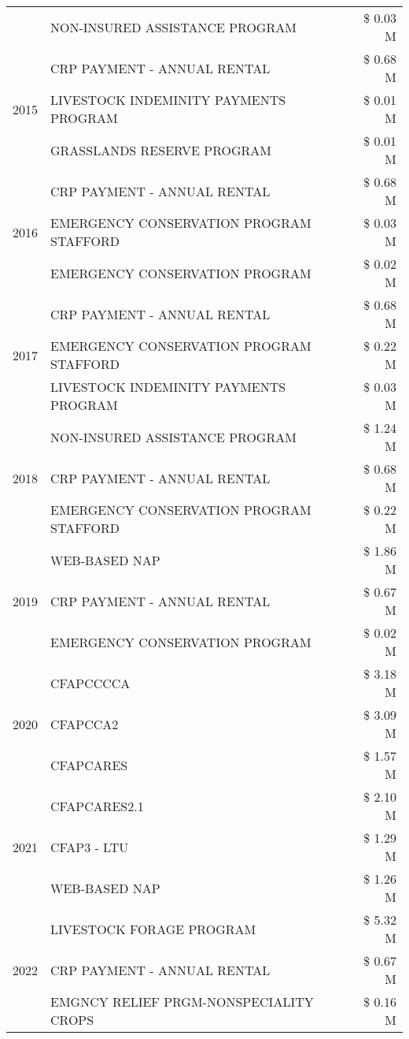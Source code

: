\begin{tabular}{llr}
 & NON-INSURED ASSISTANCE PROGRAM & \$ 0.03 M \\
\cline{1-3}
\multirow[t]{3}{*}{2015} & CRP PAYMENT - ANNUAL RENTAL & \$ 0.68 M \\
 & LIVESTOCK INDEMINITY PAYMENTS PROGRAM & \$ 0.01 M \\
 & GRASSLANDS RESERVE PROGRAM & \$ 0.01 M \\
\cline{1-3}
\multirow[t]{3}{*}{2016} & CRP PAYMENT - ANNUAL RENTAL & \$ 0.68 M \\
 & EMERGENCY CONSERVATION PROGRAM STAFFORD & \$ 0.03 M \\
 & EMERGENCY CONSERVATION PROGRAM & \$ 0.02 M \\
\cline{1-3}
\multirow[t]{3}{*}{2017} & CRP PAYMENT - ANNUAL RENTAL & \$ 0.68 M \\
 & EMERGENCY CONSERVATION PROGRAM STAFFORD & \$ 0.22 M \\
 & LIVESTOCK INDEMINITY PAYMENTS PROGRAM & \$ 0.03 M \\
\cline{1-3}
\multirow[t]{3}{*}{2018} & NON-INSURED ASSISTANCE PROGRAM & \$ 1.24 M \\
 & CRP PAYMENT - ANNUAL RENTAL & \$ 0.68 M \\
 & EMERGENCY CONSERVATION PROGRAM STAFFORD & \$ 0.22 M \\
\cline{1-3}
\multirow[t]{3}{*}{2019} & WEB-BASED NAP & \$ 1.86 M \\
 & CRP PAYMENT - ANNUAL RENTAL & \$ 0.67 M \\
 & EMERGENCY CONSERVATION PROGRAM & \$ 0.02 M \\
\cline{1-3}
\multirow[t]{3}{*}{2020} & CFAPCCCCA & \$ 3.18 M \\
 & CFAPCCA2 & \$ 3.09 M \\
 & CFAPCARES & \$ 1.57 M \\
\cline{1-3}
\multirow[t]{3}{*}{2021} & CFAPCARES2.1 & \$ 2.10 M \\
 & CFAP3 - LTU & \$ 1.29 M \\
 & WEB-BASED NAP & \$ 1.26 M \\
\cline{1-3}
\multirow[t]{3}{*}{2022} & LIVESTOCK FORAGE PROGRAM & \$ 5.32 M \\
 & CRP PAYMENT - ANNUAL RENTAL & \$ 0.67 M \\
 & EMGNCY RELIEF PRGM-NONSPECIALITY CROPS & \$ 0.16 M \\
\cline{1-3}
\bottomrule
\end{tabular}
